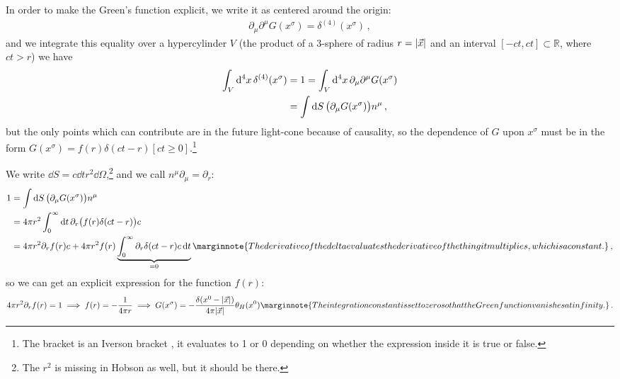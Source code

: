 \documentclass[main.tex]{subfiles}
\begin{document}
In order to make the Green's function explicit, we write it as centered around the origin:
%
\begin{align}
\partial_{\mu } \partial^{\mu } G(x^{\sigma }) = \delta^{(4)} (x^{\sigma })
\,,
\end{align}
%
and we integrate this equality over a hypercylinder \(V\) (the product of a 3-sphere of radius \(r = \abs{\vec{x}}\) and an interval \([-ct, ct]\subset \mathbb{R}\), where \(ct > r\)) we have 
%
\begin{subequations}
\begin{align}
\int_V \dd[4]{x} \delta^{(4)} (x^{\sigma }) &= 1  = \int_{V} \dd[4]{x} \partial_{\mu } \partial^{\mu } G(x^{\sigma })  \\
&= \int \dd{S} \qty(\partial_{\mu } G(x^{\sigma })) n^{\mu } 
\,,
\end{align}
\end{subequations}
%
but the only points which can contribute are in the future light-cone because of causality, so the dependence of \(G\) upon \(x^{\sigma }\) must be in the form \(G(x^{\sigma }) = f(r) \delta (ct - r) [ct \geq 0]\).\footnote{The bracket is an Iverson bracket \cite[]{knuthTwoNotesNotation1992}, it evaluates to 1 or 0 depending on whether the expression inside it is true or false.}

We write \(\dd{S} = c \dd{t} r^2 \dd{\Omega }\),\footnote{The \(r^2\) is missing in Hobson \cite[pag.\ 477]{hobsonGeneralRelativityIntroduction2006a} as well, but it should be there.} and we call \(n^{\mu } \partial_{\mu } = \partial_{r}\): 
%
\begin{subequations}
\begin{align}
1 &= \int \dd{S} \qty(\partial_{\mu } G(x^{\sigma })) n^{\mu }  \\
&= 4 \pi r^2 \int_0^{ \infty } \dd{t} \partial_{r} \qty(f(r) \delta (ct-r) )c  \\
&= 4 \pi r^2 \partial_{r} f(r) c + 4 \pi r^2 f(r) \underbrace{\int_{0}^{ \infty }  \partial_{r} \delta (ct - r) c \dd{t}}_{= 0}
\marginnote{The derivative of the delta evaluates the derivative of the thing it multiplies, which is a constant.}
\,,
\end{align}
\end{subequations}
%
so we can get an explicit expression for the function \(f(r)\):
%
\begin{align}
4 \pi r^2 \partial_{r} f(r) = 1 \implies 
f(r) = - \frac{1}{4 \pi r}
\implies G(x^{\sigma }) = - \frac{ \delta (x^{0} - \abs{\vec{x}})}{4 \pi \abs{\vec{x}}} \theta_H (x^{0})
\marginnote{The integration constant is set to zero so that the Green function vanishes at infinity.}
\,.
\end{align}
\end{document}
